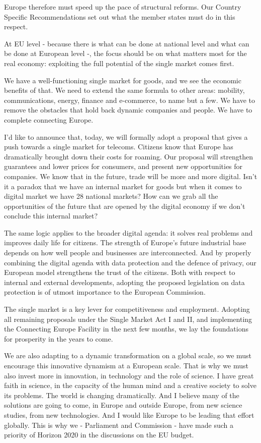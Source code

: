 \documentclass[a4paper,11pt]{article}
\begin{document}
Europe therefore must speed up the pace of structural reforms. Our Country Specific Recommendations set out what the member states must do in this respect.

At EU level - because there is what can be done at national level and what can be done at European level -, the focus should be on what matters most for the real economy: exploiting the full potential of the single market comes first.

We have a well-functioning single market for goods, and we see the economic benefits of that. We need to extend the same formula to other areas: mobility, communications, energy, finance and e-commerce, to name but a few. We have to remove the obstacles that hold back dynamic companies and people. We have to complete connecting Europe.

I'd like to announce that, today, we will formally adopt a proposal that gives a push towards a single market for telecoms. Citizens know that Europe has dramatically brought down their costs for roaming. Our proposal will strengthen guarantees and lower prices for consumers, and present new opportunities for companies. We know that in the future, trade will be more and more digital. Isn't it a paradox that we have an internal market for goods but when it comes to digital market we have 28 national markets? How can we grab all the opportunities of the future that are opened by the digital economy if we don't conclude this internal market?

The same logic applies to the broader digital agenda: it solves real problems and improves daily life for citizens. The strength of Europe's future industrial base depends on how well people and businesses are interconnected. And by properly combining the digital agenda with data protection and the defence of privacy, our European model strengthens the trust of the citizens. Both with respect to internal and external developments, adopting the proposed legislation on data protection is of utmost importance to the European Commission.

The single market is a key lever for competitiveness and employment. Adopting all remaining proposals under the Single Market Act I and II, and implementing the Connecting Europe Facility in the next few months, we lay the foundations for prosperity in the years to come.

We are also adapting to a dynamic transformation on a global scale, so we must encourage this innovative dynamism at a European scale. That is why we must also invest more in innovation, in technology and the role of science. I have great faith in science, in the capacity of the human mind and a creative society to solve its problems. The world is changing dramatically. And I believe many of the solutions are going to come, in Europe and outside Europe, from new science studies, from new technologies. And I would like Europe to be leading that effort globally. This is why we - Parliament and Commission - have made such a priority of Horizon 2020 in the discussions on the EU budget.
\end{document}
